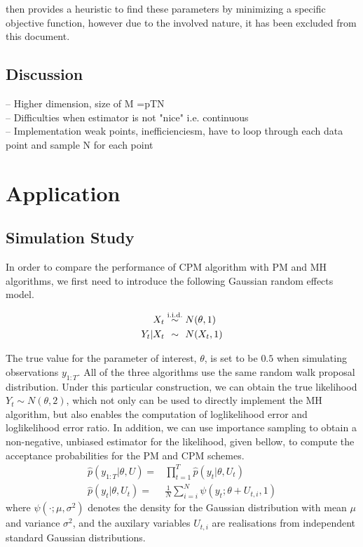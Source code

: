 \documentclass{article}
\begin{document}
\cite{cpmmDeligiannidis2015} then provides a heuristic to find these parameters by minimizing a specific objective function, however due to the involved nature, it has been excluded from this document.



\subsection{Discussion}
    -- Higher dimension, size of M =pTN \\
    -- Difficulties when estimator is not "nice" i.e. continuous \\
    -- Implementation weak points, inefficienciesm, have to loop through each data point and sample N for each point



  \section{Application}






  \subsection{Simulation Study}
  In order to compare the performance of CPM algorithm with PM and MH algorithms, we first need to introduce the following Gaussian random effects model.

  \begin{align*}
  X_t &\overset{\text{i.i.d.}}{\sim} N(\theta, 1) \\
  Y_t | X_t &\overset{\hphantom{\text{i.i.d.}}}{\sim} N(X_t, 1)
  \end{align*}

The true value for the parameter of interest, $\theta$, is set to be $0.5$ when simulating observations $y_{1:T}$. All of the three algorithms use the same random walk proposal distribution. Under this particular construction, we can obtain the true likelihood $Y_t \sim N(\theta, 2)$, which not only can be used to directly implement the MH algorithm, but also enables the computation of loglikelihood error and loglikelihood error ratio. In addition, we can use importance sampling to obtain a non-negative, unbiased estimator for the likelihood, given bellow, to compute the acceptance probabilities for the PM and CPM schemes.
\begin{align*}
\hat{p}(y_{1:T}| \theta, U) =& \prod_{t=1}^{T} \hat{p}(y_t|\theta, U_t) \\
\hat{p}(y_t| \theta, U_t)=& \frac{1}{N} \sum_{i=i}^N \psi (y_t; \theta + U_{t,i}, 1)
\end{align*}
where $\psi(\cdot; \mu, \sigma^2)$ denotes the density for the Gaussian distribution with mean $\mu$ and variance $\sigma^2$, and the auxilary variables $U_{t,i}$ are realisations from independent standard Gaussian distributions. \\
\end{document}
